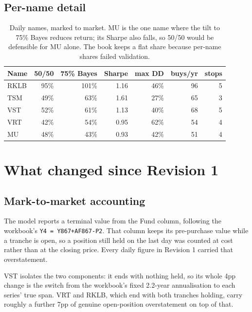 \documentclass[11pt]{article}
\begin{document}
\subsection{Per-name detail}

\begin{table}[H]\centering\small
\begin{tabular}{lrrrrrr}
\toprule
\textbf{Name} & \textbf{50/50} & \textbf{75\% Bayes} & \textbf{Sharpe} & \textbf{max DD} &
\textbf{buys/yr} & \textbf{stops}\\
\midrule
\rowcolor{bckeep} RKLB & 95\% & 101\% & 1.16 & 46\% & 96 & 5\\
TSM  & 49\% & 63\% & 1.61 & 27\% & 65 & 3\\
\rowcolor{bckeep} VST  & 52\% & 61\% & 1.13 & 40\% & 68 & 5\\
VRT  & 42\% & 54\% & 0.95 & 62\% & 54 & 4\\
\rowcolor{bckeep} MU   & 48\% & 43\% & 0.93 & 42\% & 51 & 4\\
\bottomrule
\end{tabular}
\caption{Daily names, marked to market. MU is the one name where the tilt to 75\% Bayes reduces
return; its Sharpe also falls, so 50/50 would be defensible for MU alone. The book keeps a flat
share because per-name shares failed validation.}
\end{table}

\section{What changed since Revision 1}

\subsection{Mark-to-market accounting}

The model reports a terminal value from the Fund column, following the workbook's
\texttt{Y4 = Y867+AF867-P2}. That column keeps its pre-purchase value while a tranche is open, so
a position still held on the last day was counted at cost rather than at the closing price. Every
daily figure in Revision 1 carried that overstatement.

VST isolates the two components: it ends with nothing held, so its whole 4pp change is the switch
from the workbook's fixed 2.2-year annualisation to each series' true span. VRT and RKLB, which
end with both tranches holding, carry roughly a further 7pp of genuine open-position
overstatement on top of that.
\end{document}
